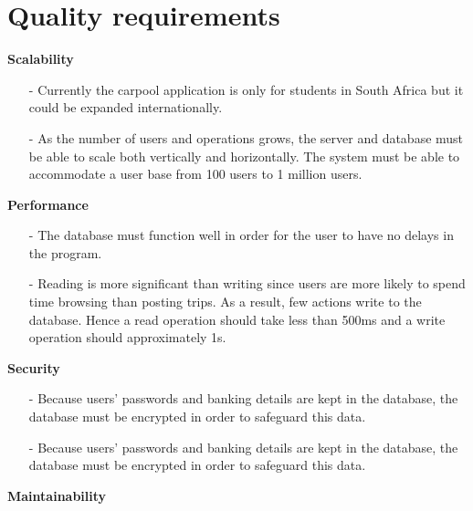\documentclass[hidelinks, 12pt, a4paper]{article}
\begin{document}
\section{Quality requirements}
    \large{ \textbf{Scalability}}
        \begin{itemize}
            \item[-] Currently the carpool application is only for students in South Africa but it could be expanded internationally. 
            \item[-] As the number of users and operations grows, the server and database must be able to scale both vertically and horizontally.  The system must be able to accommodate a user base from 100 users to 1 million users.
          \end{itemize} 
\vspace{0.5cm}
    \large{ \textbf{Performance}}
            \begin{itemize}
             \item[-] The database must function well in order for the user to have no delays in the program. 
             \item[-] Reading is more significant than writing since users are more likely to spend time browsing than posting trips. As a result, few actions write to the database. Hence a read operation should take less than 500ms and a write operation should approximately 1s.
             
             \end{itemize}
\vspace{0.5cm}
    \large{ \textbf{Security}}
         \begin{itemize}
            \item[-] Because users' passwords and banking details  are kept in the database, the database must be encrypted in order to safeguard this data. 
            \item [-] Because users' passwords and banking details  are kept in the database, the database must be encrypted in order to safeguard this data. 
        \end{itemize}
\vspace{0.5cm}    
    \large{ \textbf{Maintainability}}
\end{document}

